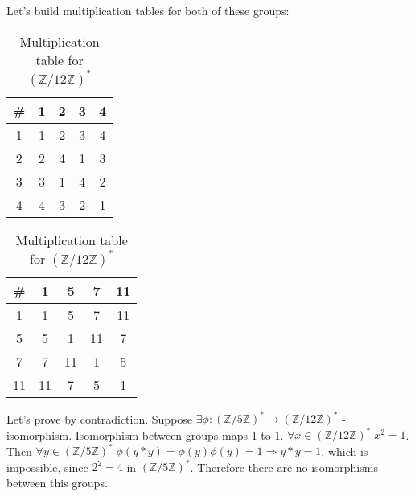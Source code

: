\documentclass[a4paper,12pt]{article}
\newcommand{\gmznz}[1]{(\mathbb{Z}/#1\mathbb{Z})^*}
\begin{document}
Let's build multiplication tables for both of these groups:

\begin{table}[h!]
	\begin{minipage}{0.48\textwidth}
		\centering
		\caption{Multiplication table for $ \gmznz{5} $}
		\begin{tabular}{||c||c|c|c|c||}
			\hline
			\# & 1 & 2 & 3 & 4 \\ 
			\hline\hline
			1  & 1 & 2 & 3 & 4 \\
			2  & 2 & 4 & 1 & 3 \\
			3  & 3 & 1 & 4 & 2 \\
			4  & 4 & 3 & 2 & 1 \\
			\hline
		\end{tabular}

		\label{table:1}
	\end{minipage}
	\begin{minipage}{0.48\textwidth}
		\centering
		\caption{Multiplication table for $ \gmznz{12} $}
		\begin{tabular}{||c||c|c|c|c||}
			\hline
			\# & 1 & 5 & 7 & 11 \\
			\hline\hline
			1  & 1 & 5 & 7 & 11 \\
			5  & 5 & 1 & 11 & 7 \\
			7  & 7 & 11 & 1 & 5 \\
			11  & 11 & 7 & 5 & 1 \\
			\hline
		\end{tabular}

		\label{table:1}
	\end{minipage}
\end{table}

Let's prove by contradiction. Suppose $ \exists \phi : \gmznz{5} \rightarrow \gmznz{12} $ - isomorphism. Isomorphism between groups maps 1 to 1. $ \forall x \in \gmznz{12}\; x^2 = 1  $. Then $\forall y \in \gmznz{5}\; \phi(y*y) = \phi(y)\phi(y) = 1  \Rightarrow y*y = 1$, which is impossible, since $ 2^2 = 4 $ in $\gmznz{5}$. Therefore there are no isomorphisms between this groups.

\hfill \square
\end{document}
